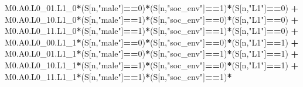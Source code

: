 \documentclass[
]{book}
\newenvironment{Shaded}{\begin{snugshade}}{\end{snugshade}}
\newcommand{\DecValTok}[1]{\textcolor[rgb]{0.00,0.00,0.81}{#1}}
\newcommand{\NormalTok}[1]{#1}
\newcommand{\SpecialCharTok}[1]{\textcolor[rgb]{0.81,0.36,0.00}{\textbf{#1}}}
\newcommand{\StringTok}[1]{\textcolor[rgb]{0.31,0.60,0.02}{#1}}
\begin{document}
\begin{Shaded}
\begin{Highlighting}[]
\NormalTok{          M0.A0.L0\_01.L1\_0}\SpecialCharTok{*}\NormalTok{(S[n,}\StringTok{"male"}\NormalTok{]}\SpecialCharTok{==}\DecValTok{0}\NormalTok{)}\SpecialCharTok{*}\NormalTok{(S[n,}\StringTok{"soc\_env"}\NormalTok{]}\SpecialCharTok{==}\DecValTok{1}\NormalTok{)}\SpecialCharTok{*}\NormalTok{(S[n,}\StringTok{"L1"}\NormalTok{]}\SpecialCharTok{==}\DecValTok{0}\NormalTok{) }\SpecialCharTok{+}
\NormalTok{          M0.A0.L0\_10.L1\_0}\SpecialCharTok{*}\NormalTok{(S[n,}\StringTok{"male"}\NormalTok{]}\SpecialCharTok{==}\DecValTok{1}\NormalTok{)}\SpecialCharTok{*}\NormalTok{(S[n,}\StringTok{"soc\_env"}\NormalTok{]}\SpecialCharTok{==}\DecValTok{0}\NormalTok{)}\SpecialCharTok{*}\NormalTok{(S[n,}\StringTok{"L1"}\NormalTok{]}\SpecialCharTok{==}\DecValTok{0}\NormalTok{) }\SpecialCharTok{+} 
\NormalTok{          M0.A0.L0\_11.L1\_0}\SpecialCharTok{*}\NormalTok{(S[n,}\StringTok{"male"}\NormalTok{]}\SpecialCharTok{==}\DecValTok{1}\NormalTok{)}\SpecialCharTok{*}\NormalTok{(S[n,}\StringTok{"soc\_env"}\NormalTok{]}\SpecialCharTok{==}\DecValTok{1}\NormalTok{)}\SpecialCharTok{*}\NormalTok{(S[n,}\StringTok{"L1"}\NormalTok{]}\SpecialCharTok{==}\DecValTok{0}\NormalTok{) }\SpecialCharTok{+}
\NormalTok{          M0.A0.L0\_00.L1\_1}\SpecialCharTok{*}\NormalTok{(S[n,}\StringTok{"male"}\NormalTok{]}\SpecialCharTok{==}\DecValTok{0}\NormalTok{)}\SpecialCharTok{*}\NormalTok{(S[n,}\StringTok{"soc\_env"}\NormalTok{]}\SpecialCharTok{==}\DecValTok{0}\NormalTok{)}\SpecialCharTok{*}\NormalTok{(S[n,}\StringTok{"L1"}\NormalTok{]}\SpecialCharTok{==}\DecValTok{1}\NormalTok{) }\SpecialCharTok{+}
\NormalTok{          M0.A0.L0\_01.L1\_1}\SpecialCharTok{*}\NormalTok{(S[n,}\StringTok{"male"}\NormalTok{]}\SpecialCharTok{==}\DecValTok{0}\NormalTok{)}\SpecialCharTok{*}\NormalTok{(S[n,}\StringTok{"soc\_env"}\NormalTok{]}\SpecialCharTok{==}\DecValTok{1}\NormalTok{)}\SpecialCharTok{*}\NormalTok{(S[n,}\StringTok{"L1"}\NormalTok{]}\SpecialCharTok{==}\DecValTok{1}\NormalTok{) }\SpecialCharTok{+}
\NormalTok{          M0.A0.L0\_10.L1\_1}\SpecialCharTok{*}\NormalTok{(S[n,}\StringTok{"male"}\NormalTok{]}\SpecialCharTok{==}\DecValTok{1}\NormalTok{)}\SpecialCharTok{*}\NormalTok{(S[n,}\StringTok{"soc\_env"}\NormalTok{]}\SpecialCharTok{==}\DecValTok{0}\NormalTok{)}\SpecialCharTok{*}\NormalTok{(S[n,}\StringTok{"L1"}\NormalTok{]}\SpecialCharTok{==}\DecValTok{1}\NormalTok{) }\SpecialCharTok{+}
\NormalTok{          M0.A0.L0\_11.L1\_1}\SpecialCharTok{*}\NormalTok{(S[n,}\StringTok{"male"}\NormalTok{]}\SpecialCharTok{==}\DecValTok{1}\NormalTok{)}\SpecialCharTok{*}\NormalTok{(S[n,}\StringTok{"soc\_env"}\NormalTok{]}\SpecialCharTok{==}\DecValTok{1}\NormalTok{)}\SpecialCharTok{*}

\end{Highlighting}
\end{Shaded}
\end{document}
